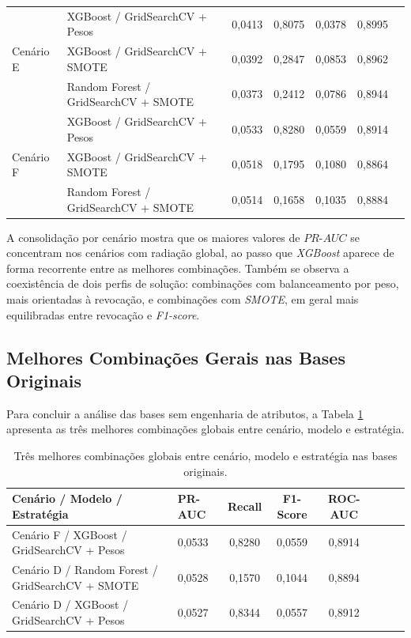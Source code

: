 \begin{table}[ht]
\begin{tabular}{llccccc}
\midrule
\multirow{3}{*}{Cenário E} 
& XGBoost / GridSearchCV + Pesos   & 0,0413 & 0,8075 & 0,0378 & 0,8995 \\
& XGBoost / GridSearchCV + SMOTE   & 0,0392 & 0,2847 & 0,0853 & 0,8962 \\
& Random Forest / GridSearchCV + SMOTE & 0,0373 & 0,2412 & 0,0786 & 0,8944 \\
\midrule
\multirow{3}{*}{Cenário F} 
& XGBoost / GridSearchCV + Pesos   & 0,0533 & 0,8280 & 0,0559 & 0,8914 \\
& XGBoost / GridSearchCV + SMOTE   & 0,0518 & 0,1795 & 0,1080 & 0,8864 \\
& Random Forest / GridSearchCV + SMOTE & 0,0514 & 0,1658 & 0,1035 & 0,8884 \\
\bottomrule
\end{tabular}
\end{table}

A consolidação por cenário mostra que os maiores valores de $PR\text{-}AUC$ se concentram nos cenários com radiação global, ao passo que \textit{XGBoost} aparece de forma recorrente entre as melhores combinações. Também se observa a coexistência de dois perfis de solução: combinações com balanceamento por peso, mais orientadas à revocação, e combinações com \textit{SMOTE}, em geral mais equilibradas entre revocação e \textit{F1-score}.

\subsection{Melhores Combinações Gerais nas Bases Originais}

Para concluir a análise das bases sem engenharia de atributos, a Tabela \ref{tab:top3_geral_sem_feat} apresenta as três melhores combinações globais entre cenário, modelo e estratégia.

\begin{table}[ht]
\centering
\caption{Três melhores combinações globais entre cenário, modelo e estratégia nas bases originais.}
\label{tab:top3_geral_sem_feat}
\small
\begin{tabular}{llcccccc}
\toprule
\textbf{Cenário / Modelo / Estratégia} & \textbf{PR-AUC} & \textbf{Recall} & \textbf{F1-Score} & \textbf{ROC-AUC} \\
\midrule
Cenário F / XGBoost / GridSearchCV + Pesos & 0,0533 & 0,8280 & 0,0559 & 0,8914 \\
Cenário D / Random Forest / GridSearchCV + SMOTE & 0,0528 & 0,1570 & 0,1044 & 0,8894 \\
Cenário D / XGBoost / GridSearchCV + Pesos & 0,0527 & 0,8344 & 0,0557 & 0,8912 \\
\bottomrule
\end{tabular}
\end{table}

